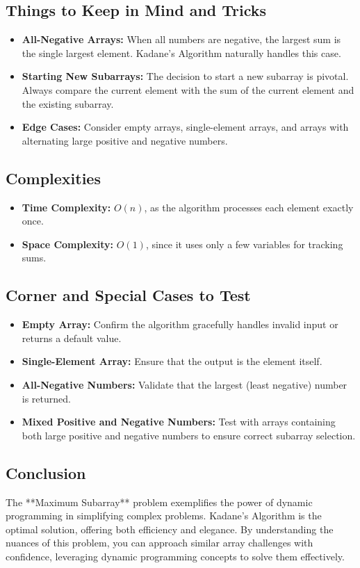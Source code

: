 \subsection*{Things to Keep in Mind and Tricks}
\begin{itemize}
    \item \textbf{All-Negative Arrays:} When all numbers are negative, the largest sum is the single largest element. Kadane's Algorithm naturally handles this case.
    \item \textbf{Starting New Subarrays:} The decision to start a new subarray is pivotal. Always compare the current element with the sum of the current element and the existing subarray.
    \item \textbf{Edge Cases:} Consider empty arrays, single-element arrays, and arrays with alternating large positive and negative numbers.
\end{itemize}

\subsection*{Complexities}
\begin{itemize}
    \item \textbf{Time Complexity:} \(O(n)\), as the algorithm processes each element exactly once.
    \item \textbf{Space Complexity:} \(O(1)\), since it uses only a few variables for tracking sums.
\end{itemize}

\subsection*{Corner and Special Cases to Test}
\begin{itemize}
    \item \textbf{Empty Array:} Confirm the algorithm gracefully handles invalid input or returns a default value.
    \item \textbf{Single-Element Array:} Ensure that the output is the element itself.
    \item \textbf{All-Negative Numbers:} Validate that the largest (least negative) number is returned.
    \item \textbf{Mixed Positive and Negative Numbers:} Test with arrays containing both large positive and negative numbers to ensure correct subarray selection.
\end{itemize}

\subsection*{Conclusion}
The **Maximum Subarray** problem exemplifies the power of dynamic programming in simplifying complex problems. Kadane's Algorithm is the optimal solution, offering both efficiency and elegance. By understanding the nuances of this problem, you can approach similar array challenges with confidence, leveraging dynamic programming concepts to solve them effectively.